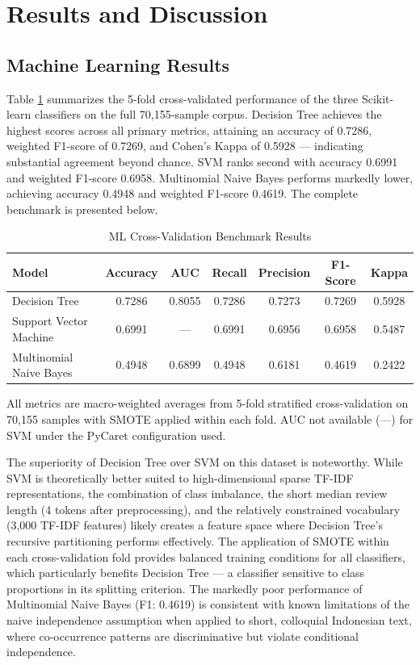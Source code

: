 \documentclass{article}
\begin{document}
\section{Results and Discussion}
\label{sec:results}

\subsection{Machine Learning Results}

Table \ref{tab:ml_results} summarizes the 5-fold cross-validated performance of the three Scikit-learn classifiers on the full 70,155-sample corpus. Decision Tree achieves the highest scores across all primary metrics, attaining an accuracy of 0.7286, weighted F1-score of 0.7269, and Cohen's Kappa of 0.5928 --- indicating substantial agreement beyond chance. SVM ranks second with accuracy 0.6991 and weighted F1-score 0.6958. Multinomial Naive Bayes performs markedly lower, achieving accuracy 0.4948 and weighted F1-score 0.4619. The complete benchmark is presented below.

\begin{table}[H]
\centering
\caption{ML Cross-Validation Benchmark Results}
\label{tab:ml_results}
\begin{tabular}{lcccccc}
\toprule
\textbf{Model} & \textbf{Accuracy} & \textbf{AUC} & \textbf{Recall} & \textbf{Precision} & \textbf{F1-Score} & \textbf{Kappa} \\ \midrule
Decision Tree & 0.7286 & 0.8055 & 0.7286 & 0.7273 & 0.7269 & 0.5928 \\
Support Vector Machine & 0.6991 & --- & 0.6991 & 0.6956 & 0.6958 & 0.5487 \\
Multinomial Naive Bayes & 0.4948 & 0.6899 & 0.4948 & 0.6181 & 0.4619 & 0.2422 \\ \bottomrule
\end{tabular}
\end{table}

All metrics are macro-weighted averages from 5-fold stratified cross-validation on 70,155 samples with SMOTE applied within each fold. AUC not available (---) for SVM under the PyCaret configuration used.

The superiority of Decision Tree over SVM on this dataset is noteworthy. While SVM is theoretically better suited to high-dimensional sparse TF-IDF representations, the combination of class imbalance, the short median review length (4 tokens after preprocessing), and the relatively constrained vocabulary (3,000 TF-IDF features) likely creates a feature space where Decision Tree's recursive partitioning performs effectively. The application of SMOTE within each cross-validation fold provides balanced training conditions for all classifiers, which particularly benefits Decision Tree --- a classifier sensitive to class proportions in its splitting criterion. The markedly poor performance of Multinomial Naive Bayes (F1: 0.4619) is consistent with known limitations of the naive independence assumption when applied to short, colloquial Indonesian text, where co-occurrence patterns are discriminative but violate conditional independence.
\end{document}
